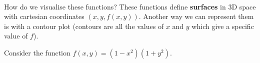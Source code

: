 \documentclass[../multivariate_calculus.tex]{subfiles}
\begin{document}
        \paragraph{}
        How do we visualise these functions?
        These functions define \textbf{surfaces} in 3D space with cartesian coordinates $(x,y,f(x,y))$.
        Another way we can represent them is with a contour plot (contours are all the values of $x$ and $y$ which give a specific value of $f$).
        \begin{example}
            Consider the function $f(x,y)=(1-x^2)(1+y^2)$.
        \end{example}
\end{document}

